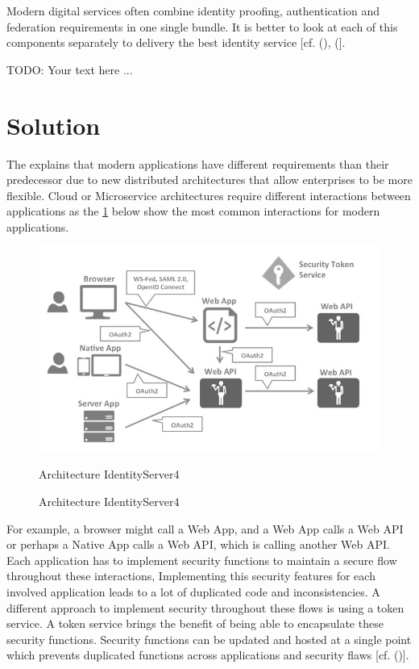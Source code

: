 Modern digital services often combine identity proofing, authentication and federation requirements in one single bundle. It is better to look at each of this components separately to delivery the best identity service [cf. (\cite{NIST:2017:DIG}), (\cite{NIST:2018:RMF}].

TODO: Your text here ...


\section{Solution}
The \cite{Sakimura:2014:OpenIDConnect} explains that modern applications have different requirements than their predecessor due to new distributed architectures that allow enterprises to be more flexible. Cloud or Microservice architectures require different interactions between applications as the \ref{fig:architecture-identityserver} below show the most common interactions for modern applications.

\begin{figure}[h]
	\centering
	\includegraphics[width=0.9\linewidth]{images/architecture-identityserver}
	\caption[Architecture IdentityServer4]{Architecture IdentityServer4}
	\caption{Architecture IdentityServer4}
	\label{fig:architecture-identityserver}
\end{figure}





For example, a browser might call a Web App, and a Web App calls a Web API or perhaps a Native App calls a Web API, which is calling another Web API. Each application has to implement security functions to maintain a secure flow throughout these interactions, Implementing this security features for each involved application leads to a lot of duplicated code and inconsistencies. A different approach to implement security throughout these flows is using a token service. A token service brings the benefit of being able to encapsulate these security functions. Security functions can be updated and hosted at a single point which prevents duplicated functions across applications and security flaws [cf. (\cite{Sakimura:2014:OpenIDConnect})].

